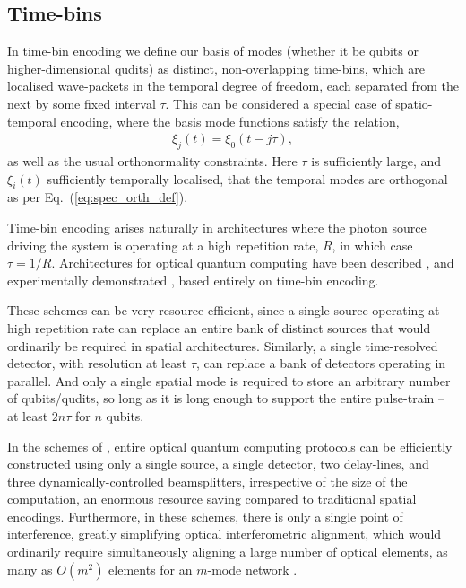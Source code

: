 \documentclass[aps, rmp, twocolumn, amsmath, amssymb, nofootinbib, superscriptaddress, longbibliography, floatfix, table-of-contents, eqsecnum]{revtex4-1}
\begin{document}
%
%

\subsection{Time-bins} \label{sec:time_bin} 

In time-bin encoding we define our basis of modes (whether it be qubits or higher-dimensional qudits) as distinct, non-overlapping time-bins, which are localised wave-packets in the temporal degree of freedom, each separated from the next by some fixed interval $\tau$. This can be considered a special case of spatio-temporal encoding, where the basis mode functions satisfy the relation,
\begin{align}
\xi_{j}(t) = \xi_0(t-j\tau),
\end{align}
as well as the usual orthonormality constraints. Here $\tau$ is sufficiently large, and $\xi_i(t)$ sufficiently temporally localised, that the temporal modes are orthogonal as per Eq.~(\ref{eq:spec_orth_def}).

Time-bin encoding arises naturally in architectures where the photon source driving the system is operating at a high repetition rate, $R$, in which case \mbox{$\tau=1/R$}. Architectures for optical quantum computing have been described \cite{bib:RohdeLoop15, bib:RohdeUnivLoop15}, and experimentally demonstrated \cite{???}, based entirely on time-bin encoding.

These schemes can be very resource efficient, since a single source operating at high repetition rate can replace an entire bank of distinct sources that would ordinarily be required in spatial architectures. Similarly, a single time-resolved detector, with resolution at least $\tau$, can replace a bank of detectors operating in parallel. And only a single spatial mode is required to store an arbitrary number of qubits/qudits, so long as it is long enough to support the entire pulse-train -- at least $2n\tau$ for $n$ qubits.

In the schemes of \cite{bib:RohdeLoop15, bib:RohdeUnivLoop15}, entire optical quantum computing protocols can be efficiently constructed using only a single source, a single detector, two delay-lines, and three dynamically-controlled beamsplitters, irrespective of the size of the computation, an enormous resource saving compared to traditional spatial encodings. Furthermore, in these schemes, there is only a single point of interference, greatly simplifying optical interferometric alignment, which would ordinarily require simultaneously aligning a large number of optical elements, as many as $O(m^2)$ elements for an $m$-mode network \cite{bib:Reck94}.
\end{document}

